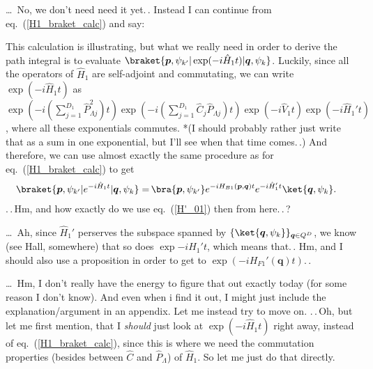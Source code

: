 \documentclass{report}
\begin{document}
\ldots\ No, we don't need need it yet.\,. Instead I can continue from eq.\ (\ref{H1_braket_calc}) and say:

This calculation is illustrating, but what we really need in order to derive the path integral is to evaluate $\braket{\boldsymbol{p}, \psi_{k'} | \exp(-i \hat H_1 t) | \boldsymbol{q}, \psi_k}$. Luckily, since all the operators of $\hat H_1$ are self-adjoint and commutating, we can write $\exp(-i \hat H_1 t)$ as 
$\exp(-i (\sum_{j=1}^{D_1} \hat P_{\Lambda j}^2 ) t)\exp(-i (\sum_{j=1}^{D_1}\hat C_j \hat P_{\Lambda j} ) t) \exp(-i \hat V_1 t) \exp(-i \hat H_1' t)$, where all these exponentials commutes. *(I should probably rather just write that as a sum in one exponential, but I'll see when that time comes.\,.) And therefore, we can use almost exactly the same procedure as for eq.\ (\ref{H1_braket_calc}) to get
\begin{align}
\begin{aligned}
	\braket{\boldsymbol{p}, \psi_{k'} | e^{-i \hat H_1 t} | \boldsymbol{q}, \psi_k} =&\,
		\bra{\boldsymbol{p}, \psi_{k'} } 
		e^{-i H_{B1}(\boldsymbol{p}, \boldsymbol{q}) t} 
			e^{-i \hat H_{1}' t}
		\ket{\boldsymbol{q}, \psi_k}.
\end{aligned}
\end{align}
.\,.\,Hm, and how exactly do we use eq.\ (\ref{H'_01}) then from here.\,.\,? %

\ldots\ Ah, since $\hat H_1'$ perserves the subspace spanned by $\{\ket{\boldsymbol{q}, \psi_k}\}_{\boldsymbol{q}\in Q^D}$, we know (see Hall, somewhere) that so does $\exp{-i H_1' t}$, which means that.\,. 
Hm, and I should also use a proposition in order to get to $\exp(-i H_{F1}'(\boldsymbol{q}) t)$.\,. 

\ldots\ Hm, I don't really have the energy to figure that out exactly today (for some reason I don't know). And even when i find it out, I might just include the explanation/argument in an appendix. Let me instead try to move on. .\,.\,Oh, but let me first mention, that I \emph{should} just look at $\exp(-i \hat H_1 t)$ right away, instead of eq.\ (\ref{H1_braket_calc}), since this is where we need the commutation properties (besides between $\hat C$ and $\hat P_\Lambda$) of $\hat H_1$. So let me just do that directly.
\end{document}
